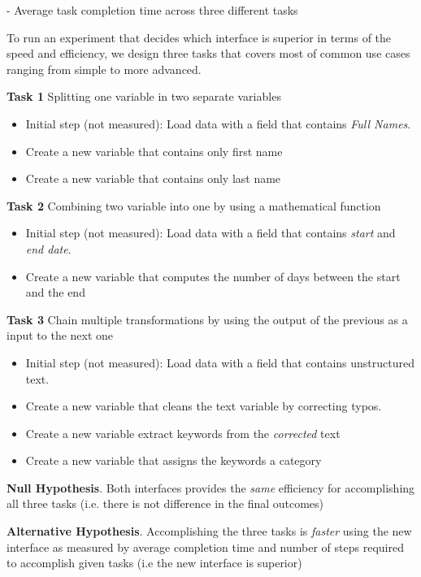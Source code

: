 \documentclass[12pt,letterpaper]{article}
\begin{document}
\hspace{20mm} - Average task completion time across three different tasks

To run an experiment that decides which interface is superior in terms of the speed and efficiency, we design three tasks that covers most of common use cases ranging from simple to more advanced. 

\textbf{Task 1} Splitting one variable in two separate variables
\begin{itemize}
    \item Initial step (not measured): Load data with a field that contains \textit{Full Names}. 
    \item Create a new variable that contains only first name
    \item Create a new variable that contains only last name
\end{itemize}

\textbf{Task 2} Combining two variable into one by using a mathematical function
\begin{itemize}
    \item Initial step (not measured): Load data with a field that contains \textit{start} and \textit{end date}. 
    \item Create a new variable that computes the number of days between the start and the end
\end{itemize}

\textbf{Task 3} Chain multiple transformations by using the output of the previous as a input to the next one
\begin{itemize}
    \item Initial step (not measured): Load data with a field that contains unstructured text. 
    \item Create a new variable that cleans the text variable by correcting typos.
    \item Create a new variable extract keywords from the \textit{corrected} text
    \item Create a new variable that assigns the keywords a category
\end{itemize}


\textbf{Null Hypothesis}. Both interfaces provides the \textit{same} efficiency for accomplishing all three tasks (i.e. there is not difference in the final outcomes)

\textbf{Alternative Hypothesis}. Accomplishing the three tasks is \textit{faster} using the new interface as measured by average completion time and number of steps required to accomplish given tasks (i.e the new interface is superior)
\end{document}
